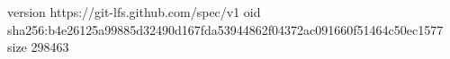 version https://git-lfs.github.com/spec/v1
oid sha256:b4e26125a99885d32490d167fda53944862f04372ac091660f51464c50ec1577
size 298463
